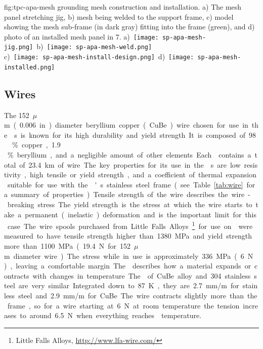 \begin{dunefigure}{fig:tpc-apa-mesh}
{ grounding mesh construction and installation. a) The mesh panel stretching jig, b) mesh being welded to the support frame, c) model showing the mesh sub-frame (in dark gray) fitting into the  frame (green), and d) photo of an installed mesh panel in  7.}
\mbox{a) \texttt{[image: sp-apa-mesh-jig.png]} \hspace{0.0mm}
b) \texttt{[image: sp-apa-mesh-weld.png]}} \\
\vspace{3mm}
\hspace{0.4mm}
\mbox{c) \texttt{[image: sp-apa-mesh-install-design.png]}
d) \texttt{[image: sp-apa-mesh-installed.png]}}
\end{dunefigure}




\subsection{Wires}
\label{sec:fdsp-apa-wires}

The \SI{152}{$\mu$m} (\SI{.006}{in}) diameter beryllium copper (CuBe) wire chosen for use in the s is known for its high durability and yield strength. It is composed of \num{98}\,\% copper, \num{1.9}\,\% beryllium, and a negligible amount of other elements. Each  contains a total of \SI{23.4}{km} of wire.  

The key properties for its use in the s are low resistivity, high tensile or yield strength, and a coefficient of thermal expansion suitable for use with the 's stainless steel frame (see Table~\ref{tab:wire} for a summary of properties).  Tensile strength of the wire describes the wire-breaking stress.  The yield strength is the stress at which the wire starts to take a permanent (inelastic) deformation and is the important limit for this case. The wire spools purchased from Little Falls Alloys\footnote{Little Falls Alloys\texttrademark, \url{http://www.lfa-wire.com/}} for use on  were measured to have tensile strength higher than \SI{1380}{MPa} and yield strength more than \SI{1100}{MPa} (\SI{19.4}{N} for \SI{152}{$\mu$m} diameter wire).  The stress while in use is approximately \SI{336}{MPa} (\SI{6}{N}), leaving a comfortable margin.

The  describes how a material expands or contracts with changes in temperature.  The  of CuBe alloy and \num{304} stainless steel are very similar.  Integrated down to \SI{87}{K}, they are \SI{2.7}{mm/m} for stainless steel and \SI{2.9}{mm/m} for CuBe. The wire contracts slightly more than the frame, so for a wire starting at \SI{6}{N} at room temperature the tension increases to around \SI{6.5}{N} when everything reaches \lar temperature.  

